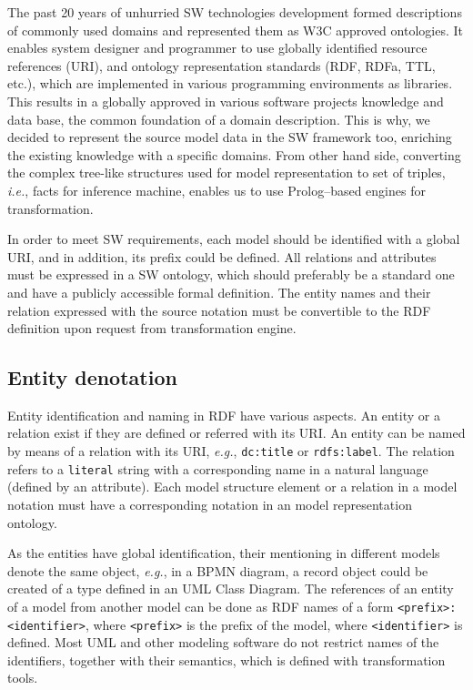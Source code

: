 \documentclass[conference]{IEEEtran}
\begin{document}
The past 20 years of unhurried SW technologies development formed descriptions of commonly used domains and represented them as W3C approved ontologies.  It enables system designer and programmer to use globally identified resource references (URI), and ontology representation standards (RDF, RDFa, TTL, etc.), which are implemented in various programming environments as libraries.  This results in a globally approved in various software projects knowledge and data base, the common foundation of a domain description.  This is why, we decided to represent the source model data in the SW framework too, enriching the existing knowledge with a specific domains.  From other hand side, converting the complex tree-like structures used for model representation to set of triples, \emph{i.e.}, facts for inference machine, enables us to use Prolog--based engines for transformation.

In order to meet SW requirements, each model should be identified with a global URI, and in addition, its prefix could be defined.  All relations and attributes must be expressed in a SW ontology, which should preferably be a standard one and have a publicly accessible formal definition.  The entity names and their relation expressed with the source notation must be convertible to the RDF definition upon request from transformation engine.

\subsection{Entity denotation}
\label{sec:ent-def}

Entity identification and naming in RDF have various aspects.  An entity or a relation exist if they are defined or referred with its URI.  An entity can be named by means of a relation with its URI, \emph{e.g.}, \texttt{dc:title} or \texttt{rdfs:label}.  The relation refers to a \texttt{literal} string with a corresponding name in a natural language (defined by an attribute).  Each model structure element or a relation in a model notation must have a corresponding notation in an model representation ontology.

As the entities have global identification, their mentioning in different models denote the same object, \emph{e.g.}, in a BPMN diagram, a record object could be created of a type defined in an UML Class Diagram.  The references of an entity of a model from another model can be done as RDF names of a form \texttt{<prefix>:<identifier>}, where \texttt{<prefix>} is the prefix of the model, where \texttt{<identifier>} is defined.  Most UML and other modeling software do not restrict names of the identifiers, together with their semantics, which is defined with transformation tools.
\end{document}
